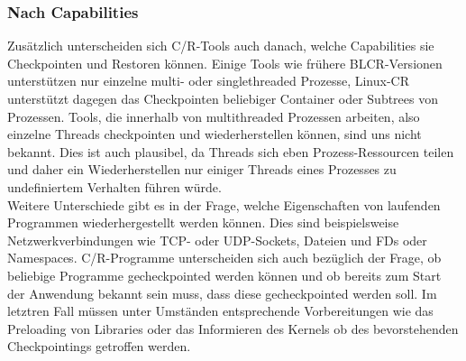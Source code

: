 \documentclass[a4paper]{article}
\begin{document}
\subsubsection{Nach Capabilities}
Zusätzlich unterscheiden sich C/R-Tools auch danach, welche Capabilities sie Checkpointen und Restoren können. 
Einige Tools wie frühere BLCR-Versionen unterstützen nur einzelne multi- oder singlethreaded Prozesse, Linux-CR unterstützt dagegen das Checkpointen beliebiger Container oder Subtrees von Prozessen.
Tools, die innerhalb von multithreaded Prozessen arbeiten, also einzelne Threads checkpointen und wiederherstellen können, sind uns nicht bekannt. 
Dies ist auch plausibel, da Threads sich eben Prozess-Ressourcen teilen und daher ein Wiederherstellen nur einiger Threads eines Prozesses zu undefiniertem Verhalten führen würde.\\
Weitere Unterschiede gibt es in der Frage, welche Eigenschaften von laufenden Programmen wiederhergestellt werden können. Dies sind beispielsweise Netzwerkverbindungen wie TCP- oder UDP-Sockets, Dateien und FDs oder Namespaces. C/R-Programme unterscheiden sich auch bezüglich der Frage, ob beliebige Programme gecheckpointed werden können und ob bereits zum Start der Anwendung bekannt sein muss, dass diese gecheckpointed werden soll. Im letztren Fall müssen unter Umständen entsprechende Vorbereitungen wie das Preloading von Libraries oder das Informieren des Kernels ob des bevorstehenden Checkpointings getroffen werden.
\end{document}

